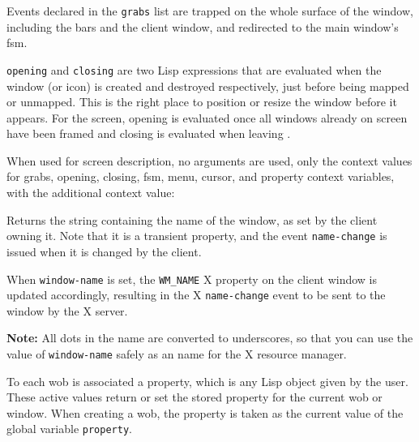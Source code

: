 Events declared in the \verb"grabs" list are trapped on the whole surface of
the window, including the bars and the client window, and redirected to the
main window's fsm.

\verb"opening" and \verb"closing" are two Lisp expressions that are
evaluated when the window (or icon) is created and destroyed respectively,
just before being mapped or unmapped. This is the right place to position or
resize the window before it appears. For the screen, opening is evaluated
once all windows already on screen have been framed and closing is evaluated
when leaving {\GWM}.

When used for screen description, no arguments are used, only the context
values for grabs, opening, closing, fsm, menu, cursor, and property context
variables, with the additional context value:


        

Returns the string containing the name of the window, as set by the client
owning it. Note that it is a transient property, and the event
\verb"name-change" is issued when it is changed by the client.  

When \verb"window-name" is set, the \verb|WM_NAME| X property on the
client window is updated accordingly, resulting in the X \verb"name-change"
event to be sent to the window by the X server.

{\bf Note:} All dots in the name are converted to underscores, so that you
can use the value of \verb"window-name" safely as an name for the X resource
manager.

        

To each wob is associated a property, which is any Lisp object given by the
user. These active values return or set the stored property for the
current wob or window. When
creating a wob, the property is taken as the current value of the global
variable \verb"property".

        
